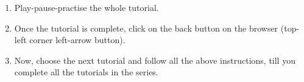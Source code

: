 \documentclass[11pt]{article}
\newenvironment{enumcpt}{\begin{enumerate} \topsep 0pt \partopsep 0pt 
	\parsep 0pt
	\itemsep 0pt \leftmargin -1in \rightmargin 0pt
}{\end{enumerate}}
\begin{document}
\begin{multicols}{2}
\begin{enumcpt}
\begin{enumcpt}
  	\item Remember to save all your work in your directory.
  	\item This will ensure that your files don't get over-written by someone else.
  	\item Remember to save your work from time to time, instead of saving it at the end of the task.
  	\item Attempt all the given assignments as instructed in the tutorial.
\end{enumcpt}

\subsection {Common instructions to use Code files}
\begin{enumcpt}
		 \item Click on the link {\tt "Code files"} below the video player and save it in your folder.
	\item Extract the downloaded zip file.
	\item You will see all the code/source files used in the particular tutorial.
	\item Use these files as per the instructions given in the particular tutorial. \\
\end{enumcpt}

  \item Play-pause-practise the whole tutorial.
  \item Once the tutorial is complete, click on the back button on the browser (top-left corner left-arrow button).
  \item Now, choose the next tutorial and follow all the above instructions, till you complete all the tutorials in the series.
\end{enumcpt}

\end{multicols}
\end{document}
